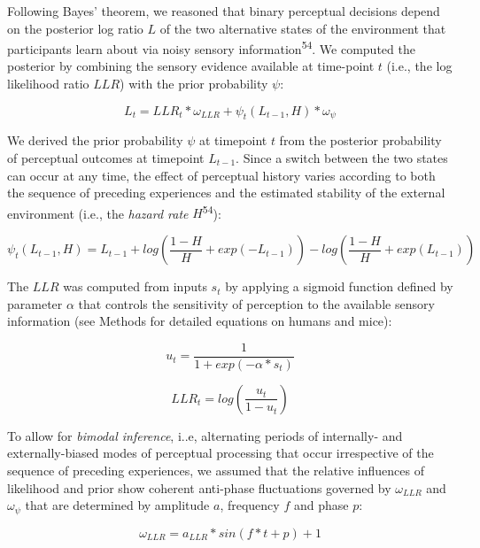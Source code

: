 \documentclass[
]{article}
\begin{document}
Following Bayes' theorem, we reasoned that binary perceptual decisions
depend on the posterior log ratio \(L\) of the two alternative states of
the environment that participants learn about via noisy sensory
information\textsuperscript{54}. We computed the posterior by combining
the sensory evidence available at time-point \(t\) (i.e., the log
likelihood ratio \(LLR\)) with the prior probability \(\psi\):

\begin{equation}
L_t = LLR_t * \omega_{LLR} + \psi_t(L_{t-1}, H) * \omega_{\psi}
\end{equation}

We derived the prior probability \(\psi\) at timepoint \(t\) from the
posterior probability of perceptual outcomes at timepoint \(L_{t-1}\).
Since a switch between the two states can occur at any time, the effect
of perceptual history varies according to both the sequence of preceding
experiences and the estimated stability of the external environment
(i.e., the \emph{hazard rate} \(H\)\textsuperscript{54}):

\begin{equation}
\psi_t(L_{t-1}, H)  = L_{t-1} + log(\frac{1-H}{H} + exp(-L_{t-1})) - log(\frac{1-H}{H} + exp(L_{t-1}))
\end{equation}

The \(LLR\) was computed from inputs \(s_t\) by applying a sigmoid
function defined by parameter \(\alpha\) that controls the sensitivity
of perception to the available sensory information (see Methods for
detailed equations on humans and mice):

\begin{equation}
u_t = \frac{1}{1 + exp(-\alpha * s_t)}
\end{equation}

\begin{equation}
LLR_t = log(\frac{u_t}{1-u_t})
\end{equation}

To allow for \emph{bimodal inference}, i..e, alternating periods of
internally- and externally-biased modes of perceptual processing that
occur irrespective of the sequence of preceding experiences, we assumed
that the relative influences of likelihood and prior show coherent
anti-phase fluctuations governed by \(\omega_{LLR}\) and
\(\omega_{\psi}\) that are determined by amplitude \(a\), frequency
\(f\) and phase \(p\):

\begin{equation}
\omega_{LLR} = a_{LLR} * sin(f * t + p) + 1
\end{equation}
\end{document}
